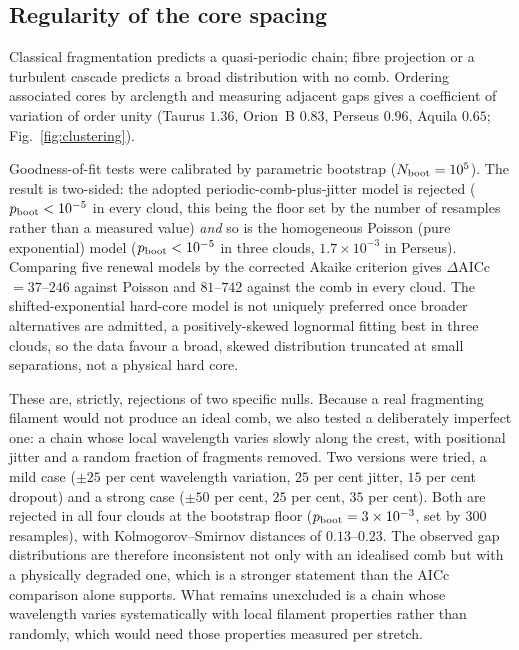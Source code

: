 \documentclass[usenatbib,twoside,twocolumn]{mnras}
\begin{document}
\subsection{Regularity of the core spacing}
\label{sec:clustering}

Classical fragmentation predicts a quasi-periodic chain; fibre projection or a turbulent cascade predicts a broad distribution with no comb. Ordering associated cores by arclength and measuring adjacent gaps gives a coefficient of variation of order unity (Taurus $1.36$, Orion~B $0.83$, Perseus $0.96$, Aquila $0.65$; Fig.~\ref{fig:clustering}).

Goodness-of-fit tests were calibrated by parametric bootstrap ($N_{\rm boot}=10^5$). The result is two-sided: the adopted periodic-comb-plus-jitter model is rejected ($p_{\rm boot}<10^{-5}$ in every cloud, this being the floor set by the number of resamples rather than a measured value) \emph{and} so is the homogeneous Poisson (pure exponential) model ($p_{\rm boot}<10^{-5}$ in three clouds, $1.7\times10^{-3}$ in Perseus). Comparing five renewal models by the corrected Akaike criterion gives $\Delta$AICc$=37$--$246$ against Poisson and $81$--$742$ against the comb in every cloud. The shifted-exponential hard-core model is not uniquely preferred once broader alternatives are admitted, a positively-skewed lognormal fitting best in three clouds, so the data favour a broad, skewed distribution truncated at small separations, not a physical hard core.

These are, strictly, rejections of two specific nulls. Because a real fragmenting filament would not produce an ideal comb, we also tested a deliberately imperfect one: a chain whose local wavelength varies slowly along the crest, with positional jitter and a random fraction of fragments removed. Two versions were tried, a mild case ($\pm25$ per cent wavelength variation, $25$ per cent jitter, $15$ per cent dropout) and a strong case ($\pm50$ per cent, $25$ per cent, $35$ per cent). Both are rejected in all four clouds at the bootstrap floor ($p_{\rm boot}=3\times10^{-3}$, set by $300$ resamples), with Kolmogorov--Smirnov distances of $0.13$--$0.23$. The observed gap distributions are therefore inconsistent not only with an idealised comb but with a physically degraded one, which is a stronger statement than the AICc comparison alone supports. What remains unexcluded is a chain whose wavelength varies systematically with local filament properties rather than randomly, which would need those properties measured per stretch.
\end{document}
